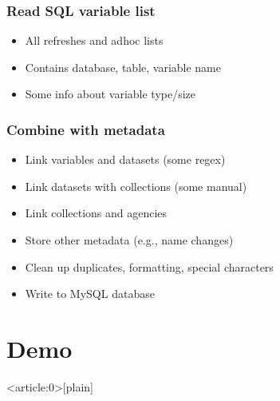 \documentclass{beamer}
\begin{document}
\begin{frame}
    \frametitle{Read SQL variable list}

    \begin{itemize}
        \item All refreshes and adhoc lists
        \item Contains database, table, variable name
        \item Some info about variable type/size
    \end{itemize}
\end{frame}

\begin{frame}
    \frametitle{Combine with metadata}

    \begin{itemize}
        \item Link variables and datasets (some regex)
        \item Link datasets with collections (some manual)
        \item Link collections and agencies
        \item Store other metadata (e.g., name changes)
        \item Clean up duplicates, formatting, special characters
        \item Write to MySQL database
    \end{itemize}
\end{frame}

\section{Demo}


{ %
\begin{frame}<article:0>[plain]
\end{frame}


}
\end{document}
